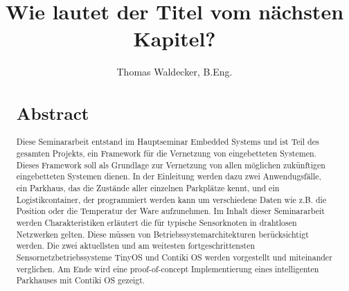 \documentclass[bibnumbered,titlepage]{scrartcl}
\title{Wie lautet der Titel vom nächsten Kapitel?}
\author{Thomas Waldecker, B.Eng.}
\date{}
\begin{document}
\maketitle
\begin{abstract}
\section*{Abstract}
Diese Seminararbeit entstand im Hauptseminar Embedded Systems und ist Teil des gesamten Projekts, ein Framework für die Vernetzung von eingebetteten Systemen. Dieses Framework soll als Grundlage zur Vernetzung von allen möglichen zukünftigen eingebetteten Systemen dienen. In der Einleitung werden dazu zwei Anwendugsfälle, ein Parkhaus, das die Zustände aller einzelnen Parkplätze kennt, und ein Logistikcontainer, der programmiert werden kann um verschiedene Daten wie z.B. die Position oder die Temperatur der Ware aufzunehmen. Im Inhalt dieser Seminararbeit werden Charakteristiken erläutert die für typische Sensorknoten in drahtlosen Netzwerken gelten. Diese müssen von Betriebssystemarchitekturen berücksichtigt werden. Die zwei aktuellsten und am weitesten fortgeschrittensten Sensornetzbetriebssysteme TinyOS und Contiki OS werden vorgestellt und miteinander verglichen. Am Ende wird eine proof-of-concept Implementierung eines intelligenten Parkhauses mit Contiki OS gezeigt.
\end{abstract}

\tableofcontents





\end{document}

